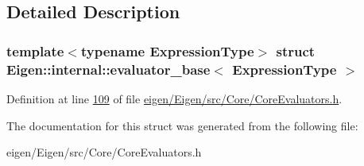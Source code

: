 \subsection{Detailed Description}
\subsubsection*{template$<$typename Expression\+Type$>$\newline
struct Eigen\+::internal\+::evaluator\+\_\+base$<$ Expression\+Type $>$}



Definition at line \hyperlink{eigen_2_eigen_2src_2_core_2_core_evaluators_8h_source_l00109}{109} of file \hyperlink{eigen_2_eigen_2src_2_core_2_core_evaluators_8h_source}{eigen/\+Eigen/src/\+Core/\+Core\+Evaluators.\+h}.



The documentation for this struct was generated from the following file\+:\begin{DoxyCompactItemize}
\item 
eigen/\+Eigen/src/\+Core/\+Core\+Evaluators.\+h\end{DoxyCompactItemize}

